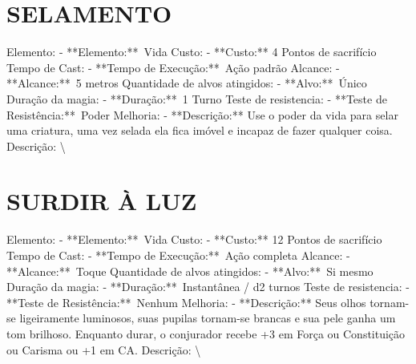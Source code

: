 \documentclass{article}%
\begin{document}
\section{SELAMENTO}%
\label{sec:SELAMENTO}%
Elemento: {-} **Elemento:**~Vida\newline%
Custo: {-} **Custo:** 4 Pontos de sacrifício\newline%
Tempo de Cast: {-} **Tempo de Execução:**~Ação padrão\newline%
Alcance: {-} **Alcance:**~5 metros\newline%
Quantidade de alvos atingidos: {-} **Alvo:**~Único\newline%
Duração da magia: {-} **Duração:**~1 Turno\newline%
Teste de resistencia: {-} **Teste de Resistência:**~Poder\newline%
Melhoria: {-} **Descrição:** Use o poder da vida para selar uma criatura, uma vez selada ela fica imóvel e incapaz de fazer qualquer coisa.\newline%
Descrição: \textbackslash{}

%
\section{SURDIR À LUZ}%
\label{sec:SURDIRLUZ}%
Elemento: {-} **Elemento:**~Vida\newline%
Custo: {-} **Custo:** 12 Pontos de sacrifício\newline%
Tempo de Cast: {-} **Tempo de Execução:**~Ação completa\newline%
Alcance: {-} **Alcance:**~Toque\newline%
Quantidade de alvos atingidos: {-} **Alvo:**~Si mesmo\newline%
Duração da magia: {-} **Duração:**~Instantânea / d2 turnos\newline%
Teste de resistencia: {-} **Teste de Resistência:**~Nenhum\newline%
Melhoria: {-} **Descrição:** Seus olhos tornam{-}se ligeiramente luminosos, suas pupilas tornam{-}se brancas e sua pele ganha um tom brilhoso. Enquanto durar, o conjurador recebe +3 em Força ou Constituição ou Carisma ou +1 em CA.\newline%
Descrição: \textbackslash{}

%
\end{document}
